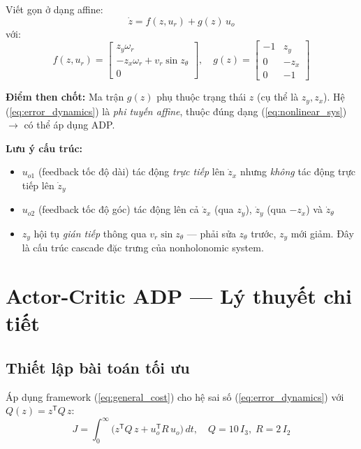 \documentclass[12pt,a4paper]{article}
\newcommand{\T}{\mathsf{T}}
\begin{document}
Viết gọn ở dạng affine:
\begin{equation}\label{eq:error_dynamics}
    \boxed{\dot{z} = f(z, u_r) + g(z)\, u_o}
\end{equation}
với:
\begin{equation}\label{eq:f_and_g}
    f(z, u_r) = \begin{bmatrix} z_y\omega_r \\ -z_x\omega_r + v_r\sin z_\theta \\ 0 \end{bmatrix}, \quad
    g(z) = \begin{bmatrix} -1 & z_y \\ 0 & -z_x \\ 0 & -1 \end{bmatrix}
\end{equation}

\textbf{Điểm then chốt:} Ma trận $g(z)$ phụ thuộc trạng thái $z$ (cụ thể là $z_y, z_x$). Hệ (\ref{eq:error_dynamics}) là \textit{phi tuyến affine}, thuộc đúng dạng (\ref{eq:nonlinear_sys}) $\to$ có thể áp dụng ADP.

\textbf{Lưu ý cấu trúc:}
\begin{itemize}[nosep]
    \item $u_{o1}$ (feedback tốc độ dài) tác động \textit{trực tiếp} lên $\dot{z}_x$ nhưng \textit{không} tác động trực tiếp lên $\dot{z}_y$
    \item $u_{o2}$ (feedback tốc độ góc) tác động lên cả $\dot{z}_x$ (qua $z_y$), $\dot{z}_y$ (qua $-z_x$) và $\dot{z}_\theta$
    \item $z_y$ hội tụ \textit{gián tiếp} thông qua $v_r\sin z_\theta$ --- phải sửa $z_\theta$ trước, $z_y$ mới giảm. Đây là cấu trúc cascade đặc trưng của nonholonomic system.
\end{itemize}

\section{Actor-Critic ADP --- Lý thuyết chi tiết}

\subsection{Thiết lập bài toán tối ưu}

Áp dụng framework (\ref{eq:general_cost}) cho hệ sai số (\ref{eq:error_dynamics}) với $Q(z) = z^\T Q\, z$:
\begin{equation}\label{eq:cost_wmr}
    J = \int_0^\infty \big( z^\T Q\, z + u_o^\T R\, u_o \big)\, dt, \quad Q = 10\,I_3,\; R = 2\,I_2
\end{equation}
\end{document}
